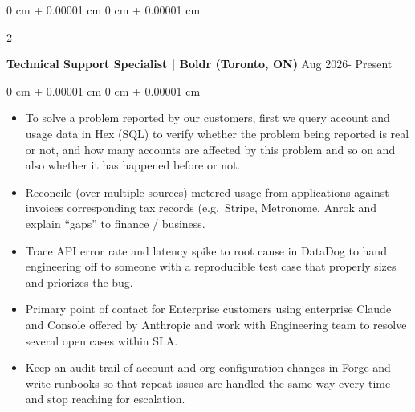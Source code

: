 \documentclass[10pt, letterpaper]{article}
\newenvironment{highlights}{
    \begin{itemize}[
        topsep=0.10 cm,
        parsep=0.10 cm,
        partopsep=0pt,
        itemsep=0pt,
        leftmargin=0 cm + 10pt
    ]
}{
    \end{itemize}
} %
\newenvironment{onecolentry}{
    \begin{adjustwidth}{
        0 cm + 0.00001 cm
    }{
        0 cm + 0.00001 cm
    }
}{
    \end{adjustwidth}
} %
\newenvironment{twocolentry}[2][]{
    \onecolentry
    \def\secondColumn{#2}
    \setcolumnwidth{\fill, 4.5 cm}
    \begin{paracol}{2}
}{
    \switchcolumn \raggedleft \secondColumn
    \end{paracol}
    \endonecolentry
} %
\begin{document}
        \begin{twocolentry}{
            {Aug 2026- Present}
        }
            \textbf{Technical Support Specialist | Boldr (Toronto, ON)}\end{twocolentry}
        \vspace{0.10 cm}
        \begin{onecolentry}
            \begin{highlights}
                \item To solve a problem reported by our customers, first we query account and usage data in Hex (SQL) to verify whether the problem being reported is real or not, and how many accounts are affected by this problem and so on and also whether it has happened before or not.
                \item Reconcile (over multiple sources) metered usage from applications against invoices corresponding tax records (e.g.\ Stripe, Metronome, Anrok and explain “gaps” to finance / business.
                \item Trace API error rate and latency spike to root cause in DataDog to hand engineering off to someone with a reproducible test case that properly sizes and priorizes the bug.
                \item Primary point of contact for Enterprise customers using enterprise Claude and Console offered by Anthropic and work with Engineering team to resolve several open cases within SLA.
                \item Keep an audit trail of account and org configuration changes in Forge and write runbooks so that repeat issues are handled the same way every time and stop reaching for escalation.
            \end{highlights}
        \end{onecolentry}
\end{document}
